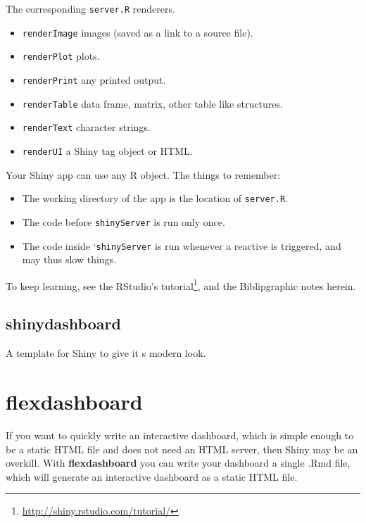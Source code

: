 \documentclass[]{book}
\providecommand{\tightlist}{%
  \setlength{\itemsep}{0pt}\setlength{\parskip}{0pt}}
\renewcommand{\href}[2]{#2\footnote{\url{#1}}}
\theoremstyle{definition}
\theoremstyle{definition}
\theoremstyle{definition}
\theoremstyle{remark}
\begin{document}
The corresponding \texttt{server.R} renderers.

\begin{itemize}
\tightlist
\item
  \texttt{renderImage} images (saved as a link to a source file).
\item
  \texttt{renderPlot} plots.
\item
  \texttt{renderPrint} any printed output.
\item
  \texttt{renderTable} data frame, matrix, other table like structures.
\item
  \texttt{renderText} character strings.
\item
  \texttt{renderUI} a Shiny tag object or HTML.
\end{itemize}

Your Shiny app can use any R object.
The things to remember:

\begin{itemize}
\tightlist
\item
  The working directory of the app is the location of \texttt{server.R}.
\item
  The code before \texttt{shinyServer} is run only once.
\item
  The code inside `\texttt{shinyServer} is run whenever a reactive is triggered, and may thus slow things.
\end{itemize}

To keep learning, see the RStudio's \href{http://shiny.rstudio.com/tutorial/}{tutorial}, and the Biblipgraphic notes herein.

\hypertarget{shinydashboard}{%
\subsection{shinydashboard}\label{shinydashboard}}

A template for Shiny to give it s modern look.

\hypertarget{flexdashboard}{%
\section{flexdashboard}\label{flexdashboard}}

If you want to quickly write an interactive dashboard, which is simple enough to be a static HTML file and does not need an HTML server, then Shiny may be an overkill.
With \textbf{flexdashboard} you can write your dashboard a single .Rmd file, which will generate an interactive dashboard as a static HTML file.
\end{document}
